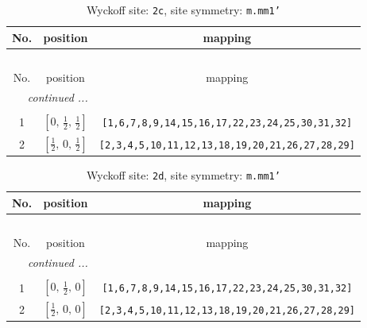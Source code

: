 \documentclass[fleqn,8pt]{jsarticle}
\begin{document}
\renewcommand{\arraystretch}{1.2}
\begin{longtable}{ccc}
\caption{Wyckoff site: {\tt 2c}, site symmetry: {\tt m.mm1'}}
 \\
 \hline \hline
No. & position & mapping \\ \hline \endfirsthead

\multicolumn{2}{l}{\tablename\ \thetable{}} \\
 \hline \hline
No. & position & mapping \\ \hline \endhead

 \hline \hline
\multicolumn{2}{r}{\footnotesize\it continued ...} \\ \endfoot

 \hline \hline
\multicolumn{2}{r}{} \\ \endlastfoot

1 & $\left[ 0,\, \frac{1}{2},\, \frac{1}{2} \right]$ & {\tt [1,6,7,8,9,14,15,16,17,22,23,24,25,30,31,32]} \\ \hline
2 & $\left[ \frac{1}{2},\, 0,\, \frac{1}{2} \right]$ & {\tt [2,3,4,5,10,11,12,13,18,19,20,21,26,27,28,29]} \\
\end{longtable}
\renewcommand{\arraystretch}{1.2}
\begin{longtable}{ccc}
\caption{Wyckoff site: {\tt 2d}, site symmetry: {\tt m.mm1'}}
 \\
 \hline \hline
No. & position & mapping \\ \hline \endfirsthead

\multicolumn{2}{l}{\tablename\ \thetable{}} \\
 \hline \hline
No. & position & mapping \\ \hline \endhead

 \hline \hline
\multicolumn{2}{r}{\footnotesize\it continued ...} \\ \endfoot

 \hline \hline
\multicolumn{2}{r}{} \\ \endlastfoot

1 & $\left[ 0,\, \frac{1}{2},\, 0 \right]$ & {\tt [1,6,7,8,9,14,15,16,17,22,23,24,25,30,31,32]} \\ \hline
2 & $\left[ \frac{1}{2},\, 0,\, 0 \right]$ & {\tt [2,3,4,5,10,11,12,13,18,19,20,21,26,27,28,29]} \\
\end{longtable}
\renewcommand{\arraystretch}{1.2}
\end{document}
